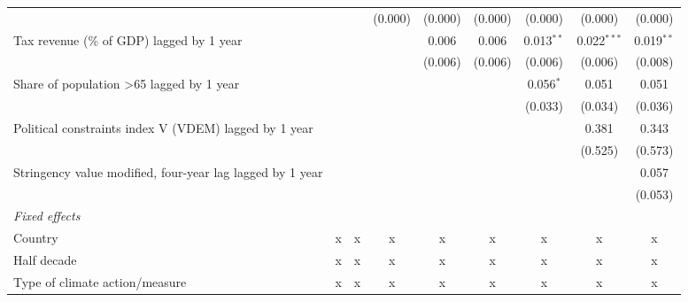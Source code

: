 \begin{tabular}{lcccccccc}
                                                             &               &               & (0.000)       & (0.000)       & (0.000)       & (0.000)        & (0.000)        & (0.000)\\   
   Tax revenue (\% of GDP) lagged by 1 year                  &               &               &               & 0.006         & 0.006         & 0.013$^{**}$   & 0.022$^{***}$  & 0.019$^{**}$\\   
                                                             &               &               &               & (0.006)       & (0.006)       & (0.006)        & (0.006)        & (0.008)\\   
   Share of population >65 lagged by 1 year                  &               &               &               &               &               & 0.056$^{*}$    & 0.051          & 0.051\\   
                                                             &               &               &               &               &               & (0.033)        & (0.034)        & (0.036)\\   
   Political constraints index V (VDEM) lagged by 1 year     &               &               &               &               &               &                & 0.381          & 0.343\\   
                                                             &               &               &               &               &               &                & (0.525)        & (0.573)\\   
   Stringency value modified, four-year lag lagged by 1 year &               &               &               &               &               &                &                & 0.057\\   
                                                             &               &               &               &               &               &                &                & (0.053)\\   
   \emph{Fixed effects}\\
   Country                                                   & x             & x             & x             & x             & x             & x              & x              & x\\  
   Half decade                                               & x             & x             & x             & x             & x             & x              & x              & x\\  
   Type of climate action/measure                            & x             & x             & x             & x             & x             & x              & x              & x\\  

\end{tabular}
